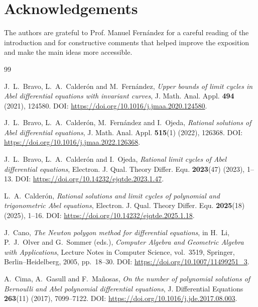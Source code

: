 \documentclass[12pt,a4paper]{amsart}
\numberwithin{theorem}{section}
\theoremstyle{definition}
\begin{document}
	\section*{Acknowledgements} 
	
	The authors are grateful to Prof. Manuel Fern\'andez for a careful reading of the introduction and for constructive comments that helped improve the exposition and make the main ideas more accessible.
	
	\begin{thebibliography}{99}
		
		J.~L.~Bravo, L.~A.~Calder\'on and M.~Fern\'andez,
		\newblock \emph{Upper bounds of limit cycles in Abel differential equations with invariant curves},
		\newblock J. Math. Anal. Appl. \textbf{494} (2021), 124580.
		\newblock DOI: \url{https://doi.org/10.1016/j.jmaa.2020.124580}.
		
		J.~L.~Bravo, L.~A.~Calder\'on, M.~Fern\'andez and I.~Ojeda,
		\newblock \emph{Rational solutions of Abel differential equations},
		\newblock J. Math. Anal. Appl. \textbf{515}(1) (2022), 126368.
		\newblock DOI: \url{https://doi.org/10.1016/j.jmaa.2022.126368}.
		
		J.~L.~Bravo, L.~A.~Calder\'on and I.~Ojeda,
		\newblock \emph{Rational limit cycles of Abel differential equations},
		\newblock Electron. J. Qual. Theory Differ. Equ. \textbf{2023}(47) (2023), 1--13.
		\newblock DOI: \url{https://doi.org/10.14232/ejqtde.2023.1.47}.
		
		L.~A.~Calder\'on,
		\newblock \emph{Rational solutions and limit cycles of polynomial and trigonometric Abel equations},
		\newblock Electron. J. Qual. Theory Differ. Equ. \textbf{2025}(18) (2025), 1--16.
		\newblock DOI: \url{https://doi.org/10.14232/ejqtde.2025.1.18}.
		
		J.~Cano,
		\newblock \emph{The Newton polygon method for differential equations},
		\newblock in H.~Li, P.~J.~Olver and G.~Sommer (eds.),
		\emph{Computer Algebra and Geometric Algebra with Applications},
		Lecture Notes in Computer Science, vol.~3519,
		Springer, Berlin--Heidelberg, 2005, pp.~18--30.
		\newblock DOI: \url{https://doi.org/10.1007/11499251_3}.
		
		A.~Cima, A.~Gasull and F.~Ma\~nosas,
		\newblock \emph{On the number of polynomial solutions of Bernoulli and Abel polynomial differential equations},
		\newblock J. Differential Equations \textbf{263}(11) (2017), 7099--7122.
		\newblock DOI: \url{https://doi.org/10.1016/j.jde.2017.08.003}.
		

\end{thebibliography}
\end{document}
